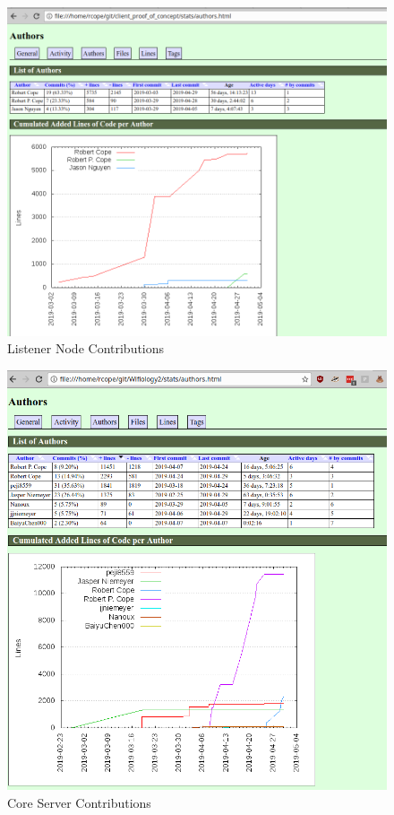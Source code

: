 \documentclass[]{article}
\begin{document}
	\begin{figure}[h]
	\label{fig:listener_node_contrib}
	\includegraphics[width=1.0\textwidth]{listenerNodeContrib}
	\caption{Listener Node Contributions}
	\end{figure}
	
	\begin{figure}[h]
	\label{fig:core_server_contrib}
	\includegraphics[width=1.0\textwidth]{coreServerContrib}
	\caption{Core Server Contributions}
	\end{figure}
	
\end{document}
